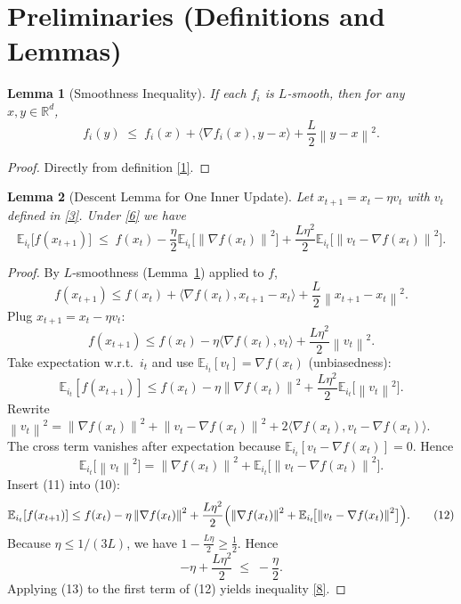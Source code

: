\documentclass{article}
\newtheorem{lemma}{Lemma}
\newcommand{\EE}{\mathbb{E}}
\newcommand{\RR}{\mathbb{R}}
\newcommand{\norm}[1]{\left\|#1\right\|}
\newcommand{\inner}[2]{\langle #1,#2\rangle}
\newcommand{\grad}{\nabla}
\begin{document}
\newpage
\section*{Preliminaries (Definitions and Lemmas)}
\begin{lemma}[Smoothness Inequality]\label{lem:smooth}
If each $f_i$ is $L$‑smooth, then for any $x,y\in\RR^{d}$,
\[
f_i(y)\;\le\; f_i(x)+\inner{\grad f_i(x)}{y-x}+\frac{L}{2}\norm{y-x}^{2}.
\]
\end{lemma}
\begin{proof}
Directly from definition \eqref{1}. \qedhere
\end{proof}

\begin{lemma}[Descent Lemma for One Inner Update]\label{lem:descent}
Let $x_{t+1}=x_t-\eta v_t$ with $v_t$ defined in \eqref{3}. Under \eqref{6} we have
\[
\EE_{i_t}\bigl[f(x_{t+1})\bigr]
\;\le\;
f(x_t)-\frac{\eta}{2}\EE_{i_t}\!\bigl[\norm{\grad f(x_t)}^{2}\bigr]
    +\frac{L\eta^{2}}{2}\EE_{i_t}\!\bigl[\norm{v_t-\grad f(x_t)}^{2}\bigr].
\tag{8}
\]
\end{lemma}
\begin{proof}
By $L$‑smoothness (Lemma~\ref{lem:smooth}) applied to $f$,
\[
f(x_{t+1})\le f(x_t)+\inner{\grad f(x_t)}{x_{t+1}-x_t}
        +\frac{L}{2}\norm{x_{t+1}-x_t}^{2}.
\]
Plug $x_{t+1}=x_t-\eta v_t$:
\[
f(x_{t+1})\le f(x_t)-\eta\inner{\grad f(x_t)}{v_t}
               +\frac{L\eta^{2}}{2}\norm{v_t}^{2}.
\tag{9}
\]
Take expectation w.r.t.\ $i_t$ and use $\EE_{i_t}[v_t]=\grad f(x_t)$ (unbiasedness):
\[
\EE_{i_t}[f(x_{t+1})]\le f(x_t)-\eta\norm{\grad f(x_t)}^{2}
    +\frac{L\eta^{2}}{2}\EE_{i_t}\!\bigl[\norm{v_t}^{2}\bigr].
\tag{10}
\]
Rewrite $\norm{v_t}^{2}= \norm{\grad f(x_t)}^{2}
      +\norm{v_t-\grad f(x_t)}^{2}
      +2\inner{\grad f(x_t)}{v_t-\grad f(x_t)}$.
The cross term vanishes after expectation because $\EE_{i_t}[v_t-\grad f(x_t)]=0$. Hence
\[
\EE_{i_t}\!\bigl[\norm{v_t}^{2}\bigr]
 = \norm{\grad f(x_t)}^{2}+\EE_{i_t}\!\bigl[\norm{v_t-\grad f(x_t)}^{2}\bigr].
\tag{11}
\]
Insert (11) into (10):
\[
\EE_{i_t}[f(x_{t+1})]\le f(x_t)-\eta\norm{\grad f(x_t)}^{2}
    +\frac{L\eta^{2}}{2}\Bigl(\norm{\grad f(x_t)}^{2}
    +\EE_{i_t}\!\bigl[\norm{v_t-\grad f(x_t)}^{2}\bigr]\Bigr).
\tag{12}
\]
Because $\eta\le 1/(3L)$, we have $1-\frac{L\eta}{2}\ge \frac{1}{2}$. Hence
\[
-\eta+\frac{L\eta^{2}}{2}\;\le\;-\frac{\eta}{2}.
\tag{13}
\]
Applying (13) to the first term of (12) yields inequality \eqref{8}. \qedhere
\end{proof}
\end{document}
